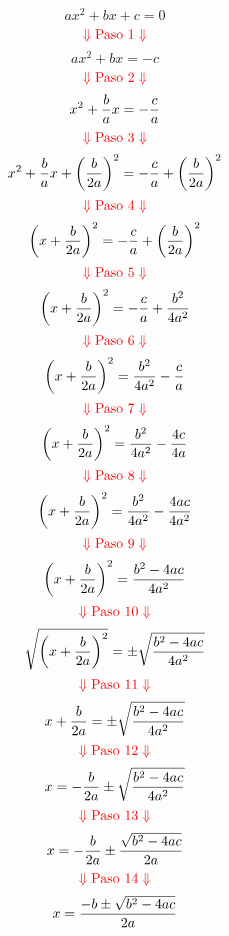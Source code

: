 \documentclass[11pt,letterpaper]{article}
\newcommand{\paso}[1]{$$\color{red}{\Downarrow\mbox{Paso #1}\Downarrow}$$}
\begin{document}
\begin{sidewaysfigure}
\begin{multicols}{2}
\setcounter{equation}{-1}
\begin{equation}
ax^2+bx+c=0
\end{equation}
\paso{1}
\begin{equation}
ax^2+bx=-c
\end{equation}
\paso{2}
\begin{equation}
x^2+{b\over a}x=-{c\over a}
\end{equation}
\paso{3}
\begin{equation}
x^2+{b\over a}x+\left({b\over 2a}\right)^2=-{c\over a}+\left({b\over 2a}\right)^2
\end{equation}
\paso{4}
\begin{equation}
\left(x+{b\over 2a}\right)^2=-{c\over a}+\left({b\over 2a}\right)^2
\end{equation}
\paso{5}
\begin{equation}
\left(x+{b\over 2a}\right)^2=-{c\over a}+{b^2\over 4a^2}
\end{equation}
\paso{6}
\begin{equation}
\left(x+{b\over 2a}\right)^2={b^2\over 4a^2}-{c\over a}
\end{equation}
\paso{7}
\begin{equation}
\left(x+{b\over 2a}\right)^2={b^2\over 4a^2}-{4c\over 4a}
\end{equation}
\paso{8}
\begin{equation}
\left(x+{b\over 2a}\right)^2={b^2\over 4a^2}-{4ac\over 4a^2}
\end{equation}
\paso{9}
\begin{equation}
\left(x+{b\over 2a}\right)^2={b^2-4ac\over 4a^2}
\end{equation}
\paso{10}
\begin{equation}
\sqrt{\left(x+{b\over 2a}\right)^2}=\pm\sqrt{{b^2-4ac\over 4a^2}}
\end{equation}
\paso{11}
\begin{equation}
x+{b\over 2a}=\pm\sqrt{{b^2-4ac\over 4a^2}}
\end{equation}
\paso{12}
\begin{equation}
x=-{b\over 2a}\pm\sqrt{{b^2-4ac\over 4a^2}}
\end{equation}
\paso{13}
\begin{equation}
x=-{b\over 2a}\pm{\sqrt{b^2-4ac}\over 2a}
\end{equation}
\paso{14}
\begin{equation}
x={-b\pm\sqrt{b^2-4ac}\over 2a}
\end{equation}
\end{multicols}
\end{sidewaysfigure}
\end{document}
